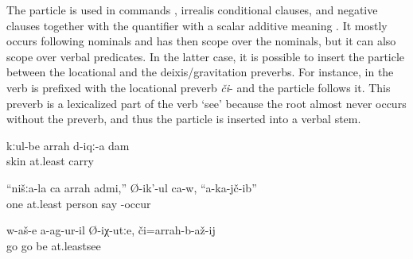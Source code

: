 The particle   is used in commands , irrealis conditional clauses, and negative clauses together with the quantifier   with a scalar additive meaning . It mostly occurs following nominals and has then scope over the nominals, but it can also scope over verbal predicates. In the latter case, it is possible to insert the particle between the locational and the deixis/gravitation preverbs. For instance, in  the verb is prefixed with the locational preverb \textit{či}- and the particle follows it. This preverb is a lexicalized part of the verb `see' because the root almost never occurs without the preverb, and thus the particle is inserted into a verbal stem.
%
\begin{exe}
	\ex	\label{ex:‎‎‎Give me at least the skin back minor}
	\gll	kːul-be	arrah	d-iqː-a	dam\\
		skin	at.least	carry	\\
	\glt	{}

	\ex	\label{ex:Of our (people) not even one man fell down, he says minor}
	\gll	``nišːa-la	ca	arrah	admi,''	Ø-ik'-ul	ca-w,	``a-ka-jč-ib''\\
			one	at.least	person	say		-occur\\
	\glt	{}

	\ex	\label{ex:Let's go if you did not go there, at least to see minor}
	\gll	w-aš-e	a-ag-ur-il	Ø-iχ-utːe,	či=arrah-b-až-ij\\
		go	go		be at.leastsee\\
	\glt	{}
\end{exe}

